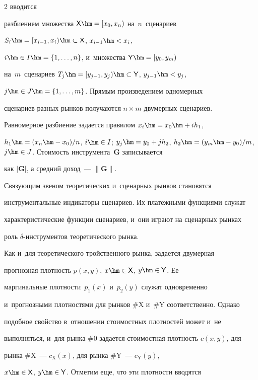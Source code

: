 \begin{multicols}{2}
 вводится 


разбиением множества ${\sf X} \hm=  [x_0, x_n)$ на~$n$~сценариев 


$S_i \hm= [x_{i-1}, x_i) \hm\subset {\sf X}$, $x_{i-1}\hm< x_i$, 


$i \hm\in I \hm= \{1, \ldots , n\}$, и~множества ${\sf Y}\hm = [y_0, y_m)$ 


на~$m$~сценариев $T_j\hm = [y_{j-1}, y_j) \hm\subset {\sf  Y}$, $y_{j-1}\hm<  y_j$, 


$j \hm\in J \hm= \{1, \ldots , m\}$. Прямым произведением одномерных 


сценариев разных рынков получаются $n\times m$ двумерных сценариев. 


Равномерное разбиение задается правилом $x_i \hm= x_0 \hm+ ih_1$, 


$h_1 \hm= (x_n \hm- x_0)/n$, $i \hm\in I$; $y_j\hm = y_0 + jh_2$, $h_2 \hm= (y_m \hm-


 y_0)/m$, $j\hm\in J$. Стоимость инструмента~$\boldsymbol{G}$ записывается 


как $\vert \boldsymbol{G}\vert$, а средний доход~--- $\| \boldsymbol{G}\|$.


  


  Связующим звеном теоретических и~сценарных рынков становятся 


инструментальные индикаторы сценариев. Их платежными функциями служат 


характеристические функции сценариев, и~они играют на сценарных рынках 


роль $\delta$-ин\-стру\-мен\-тов теоретического рынка. 


  


  Как и~для теоретического тройственного рынка, задается двумерная 


прогнозная плотность $p(x, y)$, $x\hm\in {\sf X}$, $y\hm\in {\sf Y}$. Ее 


маргинальные плотности~$p_1(x)$ и~$p_2(y)$ служат одновременно 


и~прогнозными плотностями для рынков \#X и~\#Y соответственно. Однако 


подобное свойство в~отношении стоимостных плотностей может и~не 


выполняться, и~для рынка \#0 задается стоимостная плотность $c(x, y)$, для 


рынка \#X~--- $c_{\mathrm{X}}(x)$, для рынка \#Y~--- $c_{\mathrm{Y}}(y)$, 


$x\hm\in {\sf  X}$, $y\hm\in {\sf Y}$. Отметим еще, что эти плотности вводятся 



\end{multicols}
